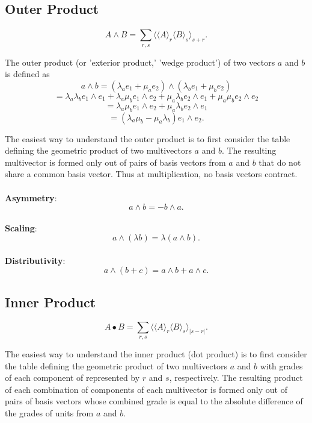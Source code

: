 \documentclass{article}
\begin{document}
\subsection{\textbf{Outer Product}}

\paragraph{}
    $$A \wedge B = \sum_{r,s} \langle \langle A \rangle_{r} \langle B \rangle_{s} \rangle_{s + r}.$$
    
The outer product (or 'exterior product,' 'wedge product') of two vectors $a$ and $b$ is defined as 
$$a \wedge b = (\lambda_a e_1 + \mu_a e_2) \wedge (\lambda_b e_1 + \mu_b e_2)$$
$$= \lambda_a \lambda_b e_1 \wedge e_1 + \lambda_a \mu_b e_1 \wedge e_2 + \mu_a \lambda_b e_2 \wedge e_1 + \mu_a \mu_b e_2 \wedge e_2$$
$$= \lambda_a \mu_b e_1 \wedge e_2 + \mu_a \lambda_b e_2 \wedge e_1$$
$$= (\lambda_a \mu_b - \mu_a \lambda_b) e_1 \wedge e_2.$$

The easiest way to understand the outer product is to first consider the table defining the geometric product of two multivectors $a$ and $b$. 
The resulting multivector is formed only out of pairs of basis vectors from $a$ and $b$ that do not share a common basis vector.
Thus at multiplication, no basis vectors contract.

\paragraph{}\textbf{Asymmetry}:
$$a \wedge b = -b \wedge a.$$
\paragraph{}\textbf{Scaling}:
$$a \wedge (\lambda b) = \lambda (a \wedge b).$$
\paragraph{}\textbf{Distributivity}:
$$a \wedge (b + c) = a \wedge b + a \wedge c.$$


\subsection{\textbf{Inner Product}}

$$A\bullet B = \sum_{r,s} \langle \langle A \rangle_{r} \langle B \rangle_{s} \rangle_{\vert s - r \vert}.$$

The easiest way to understand the inner product (dot product) is to first consider the table defining the geometric product 
of two multivectors $a$ and $b$ with grades of each component of represented by $r$ and $s$, respectively.
The resulting product of each combination of components of each multivector is formed only out of pairs of basis 
vectors whose combined grade is equal to the absolute difference of the grades of units from $a$ and $b$.
\end{document}
